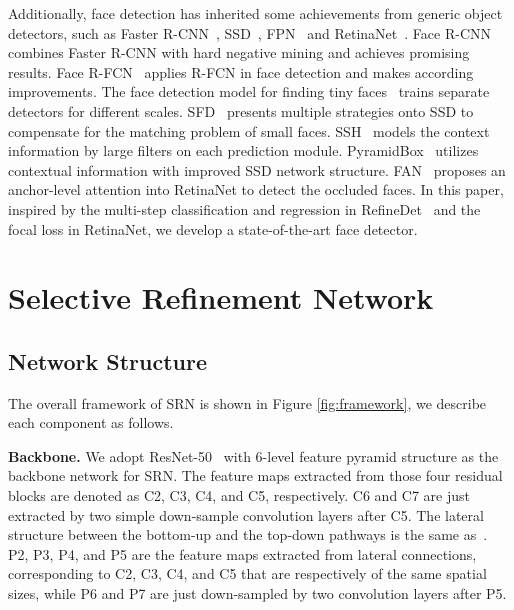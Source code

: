 \documentclass[letterpaper]{article} \usepackage{aaai19m}  \usepackage{times}  \usepackage{helvet}  \usepackage{courier}  \usepackage{url}  \usepackage{graphicx}  \usepackage{subfigure}
\begin{document}
Additionally, face detection has inherited some achievements from generic object detectors, such as Faster R-CNN~\cite{DBLP:journals/pami/RenHG017}, SSD~\cite{DBLP:conf/eccv/LiuAESRFB16}, FPN~\cite{DBLP:conf/cvpr/LinDGHHB17} and RetinaNet~\cite{DBLP:conf/iccv/LinPRK17}. 
Face R-CNN~\cite{wang2017face} combines Faster R-CNN with hard negative mining and achieves promising results. 
Face R-FCN~\cite{wang2017detecting} applies R-FCN in face detection and makes according improvements.
The face detection model for finding tiny faces~\cite{DBLP:conf/cvpr/HuR17} trains separate detectors for different scales. SFD~\cite{DBLP:conf/iccv/abs-1708-05237} presents multiple strategies onto SSD to compensate for the matching problem of small faces. SSH~\cite{DBLP:conf/iccv/NajibiSCD17} models the context information by large filters on each prediction module. PyramidBox~\cite{tang2018pyramidbox} utilizes contextual information with improved SSD network structure.
FAN~\cite{wang2017fan} proposes an anchor-level attention into RetinaNet to detect the occluded faces. In this paper, inspired by the multi-step classification and regression in RefineDet~\cite{DBLP:journals/corr/abs-1711-06897} and the focal loss in RetinaNet, we develop a state-of-the-art face detector.

\section{Selective Refinement Network}

\subsection{Network Structure}
The overall framework of SRN is shown in Figure \ref{fig:framework}, we describe each component as follows.

{\flushleft \textbf{Backbone.} }
We adopt ResNet-50~\cite{DBLP:conf/cvpr/HeZRS16} with 6-level feature pyramid structure as the backbone network for SRN. The feature maps extracted from those four residual blocks are denoted as C2, C3, C4, and C5, respectively. C6 and C7 are just extracted by two simple down-sample  convolution layers after C5. The lateral structure between the bottom-up and the top-down pathways is the same as~\cite{DBLP:conf/cvpr/LinDGHHB17}. P2, P3, P4, and P5 are the feature maps extracted from lateral connections, corresponding to C2, C3, C4, and C5 that are respectively of the same spatial sizes, while P6 and P7 are just down-sampled by two  convolution layers after P5.
\end{document}
